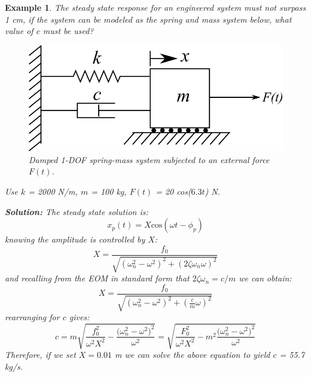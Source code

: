 \documentclass[12pt,letter]{article}
\newtheorem{ex}{Example}
\numberwithin{ex}{section} %
\newenvironment{example}{\begin{mdframed}[middlelinewidth=0.5mm]\begin{ex}\normalfont}{\end{ex}\end{mdframed}}
\numberwithin{re}{section} %
\numberwithin{vcs}{section} %
\begin{document}
\begin{example}

		

			The steady state response for an engineered system must not surpass 1 cm, if the system can be modeled as the spring and mass system below, what value of $c$ must be used?  
			\begin{figure}[H]
				\centering
				\includegraphics[]{../figures/1-DOF-spring_dashpot_mass_horizontal_forced.png}
				\caption{Damped 1-DOF spring-mass system subjected to an external force $F(t)$.}
			\end{figure}	
			\noindent Use $k$ = 2000 N/m, $m$ = 100 kg, $F(t)$ = 20 cos($6.3t$) N. 			

			\noindent\textbf{Solution:} The steady state solution is:
			\begin{equation}
				x_p(t) = X \text{cos}(\omega t - \phi_p)
			\end{equation}			 
			knowing the amplitude is controlled by $X$: 
			\begin{equation}
				X = \frac{f_0}{\sqrt{(\omega_n^2 - \omega^2)^2 +  (2\zeta \omega_n \omega)^2}} 
			\end{equation}	
			and recalling from the EOM in standard form that $2\zeta \omega_n = c/m$ we can obtain:
			\begin{equation}
				X = \frac{f_0}{\sqrt{(\omega_n^2 - \omega^2)^2 +  (\frac{c}{m} \omega)^2}} 
			\end{equation}		
			rearranging for $c$ gives:		
			\begin{equation}
				c = m\sqrt{\frac{f_0^2}{\omega^2 X^2}-\frac{\big(\omega_n^2-\omega^2\big)^2}{\omega^2}} = \sqrt{\frac{F_0^2}{\omega^2 X^2}-m^2\frac{\big(\omega_n^2-\omega^2\big)^2}{\omega^2}} 
			\end{equation}
			Therefore, if we set $X=0.01$ m we can solve the above equation to yield $c$ = 55.7 kg/s.
			
\end{example}	
\end{document}
